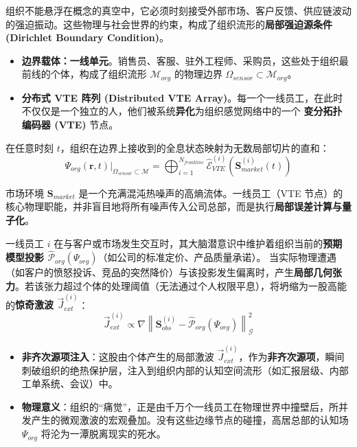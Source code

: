 
组织不能悬浮在概念的真空中，它必须时刻接受外部市场、客户反馈、供应链波动的强迫振动。这些物理与社会世界的约束，构成了组织流形的\textbf{局部强迫源条件 (Dirichlet Boundary Condition)}。

\begin{itemize}
    \item \textbf{边界载体：一线单元}。销售员、客服、驻外工程师、采购员，这些处于组织最前线的个体，构成了组织流形 $\mathcal{M}_{org}$ 的物理边界 $\Omega_{sensor} \subset \mathcal{M}_{org}$。
    \item \textbf{分布式 VTE 阵列 (Distributed VTE Array)}。每一个一线员工，在此时不仅仅是一个独立的人，他们被系统\textbf{异化}为组织感觉网络中的一个 \textbf{变分拓扑编码器 (VTE)} 节点。
\end{itemize}

在任意时刻 $t$，组织在边界上接收到的全息状态映射为无数局部切片的直和：
\begin{equation}
    \Psi_{org}(\mathbf{r}, t) \big|_{\Omega_{sensor} \subset \mathcal{M}} = \bigoplus_{i=1}^{N_{frontline}} \hat{\mathcal{E}}_{VTE}^{(i)} \left( \mathbf{S}_{market}^{(i)}(t) \right)
\end{equation}


市场环境 $\mathbf{S}_{market}$ 是一个充满混沌热噪声的高熵流体。一线员工（VTE 节点）的核心物理职能，并非盲目地将所有噪声传入公司总部，而是执行\textbf{局部误差计算与量子化}。

\begin{definition}[组织边界激波方程]
    一线员工 $i$ 在与客户或市场发生交互时，其大脑潜意识中维护着组织当前的\textbf{预期模型投影 $\hat{\mathcal{P}}_{org}(\Psi_{org})$}（如公司的标准定价、产品质量承诺）。
    当实际物理遭遇（如客户的愤怒投诉、竞品的突然降价）与该投影发生偏离时，产生\textbf{局部几何张力}。若该张力超过个体的处理阈值（无法通过个人权限平息），将坍缩为一股高能的\textbf{惊奇激波 $\vec{J}_{ext}^{(i)}$}：
    $$ \vec{J}_{ext}^{(i)} \propto \nabla \left\| \mathbf{S}_{obs}^{(i)} - \hat{\mathcal{P}}_{org}(\Psi_{org}) \right\|_{\mathcal{G}}^2 $$
\end{definition}

\begin{itemize}
    \item \textbf{非齐次源项注入}：这股由个体产生的局部激波 $\vec{J}_{ext}^{(i)}$，作为\textbf{非齐次源项}，瞬间刺破组织的绝热保护层，注入到组织内部的认知空间流形（如汇报层级、内部工单系统、会议）中。
    \item \textbf{物理意义}：组织的“痛觉”，正是由千万个一线员工在物理世界中撞壁后，所并发产生的微观激波的宏观叠加。没有这些边缘节点的碰撞，高居总部的认知场 $\Psi_{org}$ 将沦为一潭脱离现实的死水。
\end{itemize}


